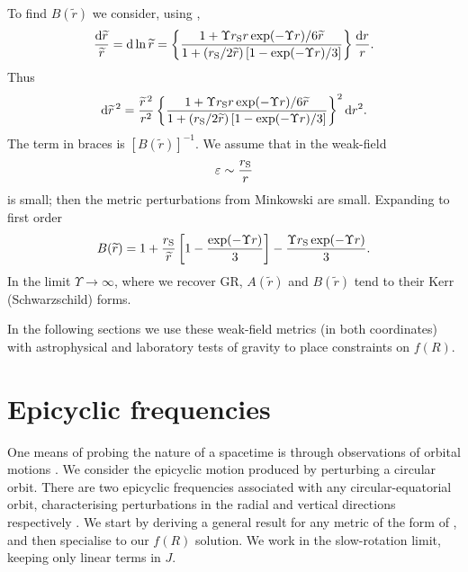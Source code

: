 To find $B(\widetilde{r})$ we consider, using ,
\begin{equation}
\dfrac{\mathrm{d} \widetilde{r}}{\widetilde{r}} =  \mathrm{d} \ln \widetilde{r} = \left\{\dfrac{1 + {\Upsilon r_\mathrm{S}r\exp(-\Upsilon r)}/{6\widetilde{r}}}{1 + ({r_\mathrm{S}}/{2\widetilde{r}})\left[1 - {\exp(-\Upsilon r)}/{3}\right]}\right\}\dfrac{\mathrm{d} r}{r}.
\end{equation}
Thus
\begin{equation}
\mathrm{d} \widetilde{r}^{\,2} = \dfrac{\widetilde{r}^{\,2}}{r^2}\left\{\dfrac{1 + {\Upsilon r_\mathrm{S}r\exp(-\Upsilon r)}/{6\widetilde{r}}}{1 + ({r_\mathrm{S}}/{2\widetilde{r}})\left[1 - {\exp(-\Upsilon r)}/{3}\right]}\right\}^2 \mathrm{d} r^2.
\end{equation}
The term in braces is $\left[B(\widetilde{r})\right]^{-1}$. We assume that in the weak-field
\begin{equation}
\varepsilon \sim \dfrac{r_\mathrm{S}}{r}
\end{equation}
is small; then the metric perturbations from Minkowski are small. Expanding to first order \citep{Olmo2007c}
\begin{equation}
B(\widetilde{r})  = 1 + \dfrac{r_\mathrm{S}}{\widetilde{r}}\left[1 - \dfrac{\exp(-\Upsilon r )}{3}\right] - \dfrac{\Upsilon r_\mathrm{S} \exp(-\Upsilon r)}{3}.
\label{eq:B_metric}
\end{equation}
In the limit $\Upsilon \rightarrow \infty$, where we recover GR, $A(\widetilde{r})$ and $B(\widetilde{r})$ tend to their Kerr (Schwarzschild) forms.

In the following sections we use these weak-field metrics (in both coordinates) with astrophysical and laboratory tests of gravity to place constraints on $f(R)$.

\section{Epicyclic frequencies}\label{sec:Epicycle}

One means of probing the nature of a spacetime is through observations of orbital motions \citep{Gair2008}. We consider the epicyclic motion produced by perturbing a circular orbit. There are two epicyclic frequencies associated with any circular-equatorial orbit, characterising perturbations in the radial and vertical directions respectively \citep[section 3.2.3]{Binney2008}. We start by deriving a general result for any metric of the form of , and then specialise to our $f(R)$ solution. We work in the slow-rotation limit, keeping only linear terms in $J$.

